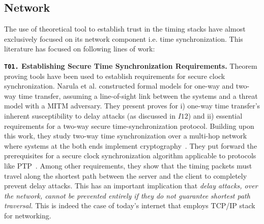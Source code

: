 \subsection{Network} \label{subsec:network-theory}
The use of theoretical tool to establish trust in the timing stacks have almost exclusively focused on its network component i.e. time synchronization. This literature has focused on following lines of work:

\noindent\textbf{\texttt{T01.} Establishing Secure Time Synchronization Requirements.} 
Theorem proving tools have been used to establish requirements for secure clock synchronization. Narula et al.\cite{net-sync-gps-sec-transfer} constructed formal models for one-way and two-way time transfer, assuming a line-of-sight link between the systems and a threat model with a MITM adversary. They present proves for i) one-way time transfer's inherent susceptibility to delay attacks (as discussed in $I12$) and ii) essential requirements for a two-way secure time-synchronization protocol. Building upon this work, they study two-way time synchronization over a multi-hop network where systems at the both ends implement cryptography~\cite{net-sync-gps-sec-sync}. They put forward the prerequisites for a secure clock synchronization algorithm applicable to protocols like PTP~\cite{ptp-std-doc}. Among other requirements, they show that the timing packets must travel along the shortest path between the server and the client to completely prevent delay attacks. This has an important implication that \textit{delay attacks, over the network, cannot be prevented entirely if they do not guarantee shortest path traversal.} This is indeed the case of today's internet that employs TCP/IP stack for networking.

